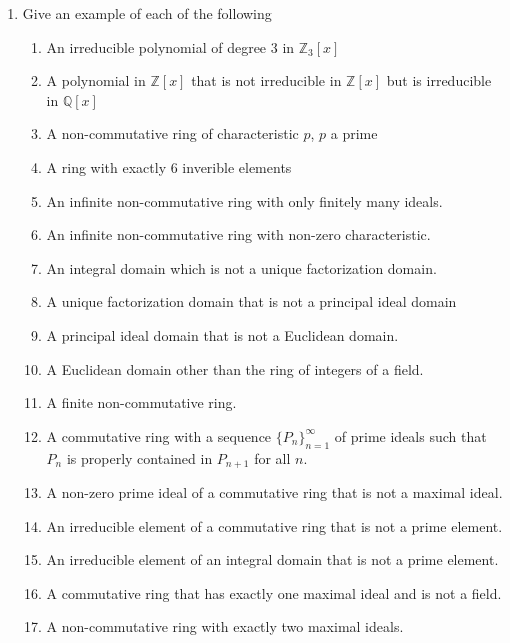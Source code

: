 \documentclass{article}
\theoremstyle{definition}
\begin{document}
\begin{enumerate}
            \item Give an example of each of the following
                \begin{enumerate}
                    \item An irreducible polynomial of degree 3 in $\mathbb{Z}_3[x]$
                    \item A polynomial in $\mathbb{Z}[x]$ that is not irreducible in $\mathbb{Z}[x]$ but is irreducible in $\mathbb{Q}[x]$
                    \item A non-commutative ring of characteristic $p$, $p$ a prime 
                    \item A ring with exactly 6 inverible elements
                    \item An infinite non-commutative ring with only finitely many ideals.
                    \item An infinite non-commutative ring with non-zero characteristic.
                    \item An integral domain which is not a unique factorization domain. 
                    \item A unique factorization domain that is not a principal ideal domain
                    \item A principal ideal domain that is not a Euclidean domain.
                    \item A Euclidean domain other than the ring of integers of a field.
                    \item A finite non-commutative ring.
                    \item A commutative ring with a sequence $\{P_n\}_{n=1}^{\infty}$ of prime ideals such that $P_n$ is properly contained in $P_{n+1}$ for all $n$.
                    \item A non-zero prime ideal of a commutative ring that is not a maximal ideal.
                    \item An irreducible element of a commutative ring that is not a prime element. 
                    \item An irreducible element of an integral domain that is not a prime element. 
                    \item A commutative ring that has exactly one maximal ideal and is not a field.
                    \item A non-commutative ring with exactly two maximal ideals.
                \end{enumerate}
            

\end{enumerate}
\end{document}
